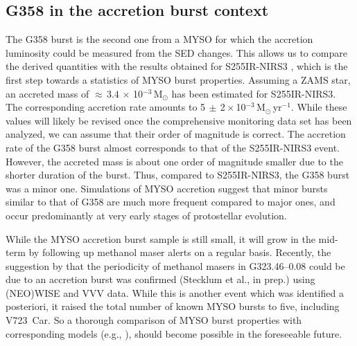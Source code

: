 \subsection{G358 in the accretion burst context}
The G358 burst is the second one from a MYSO for which the accretion luminosity could be measured from the SED changes. This allows us to compare the derived quantities with the results obtained for S255IR-NIRS3 \citep{2017NatPh..13..276C}, which is the first step towards a statistics of MYSO burst properties. 
Assuming a ZAMS star, an accreted mass of ${\approx}\, 3.4\,{\times}\,$10$^{-3}$\,M$_\odot$ has been estimated for S255IR-NIRS3. The corresponding accretion rate amounts to
5$\,{\pm}\,$2\,${\times}\,$10$^{-3}$\,M$_\odot$\,yr$^{-1}$. While these values will likely be revised once the comprehensive monitoring data set has been analyzed, we can assume that their order of magnitude is correct.
The accretion rate of the G358 burst almost corresponds to that of the S255IR-NIRS3 event. However, the accreted mass is about one order of magnitude smaller due to the shorter duration of the burst. Thus,
compared to S255IR-NIRS3, the G358 burst was a minor one.
Simulations of MYSO accretion \citep{2019MNRAS.482.5459M} suggest that minor bursts similar to that of G358 are much more frequent compared to major ones, and occur predominantly at very early stages of protostellar evolution.

While the MYSO accretion burst sample is still small, it will grow in the mid-term by following up methanol maser alerts on a regular basis. Recently, the suggestion by \citet{2019MNRAS.487.2407P} that the periodicity of methanol masers in G323.46--0.08 could be due to an accretion burst was confirmed (Stecklum et al., in prep.) using (NEO)WISE and VVV data. While this is another event which was identified a posteriori, it raised the total number of known MYSO bursts to five,
including V723~Car.
So a  thorough comparison of MYSO burst properties with corresponding models (e.g., \citealp{2019MNRAS.482.5459M}), should become possible in the foreseeable future.


